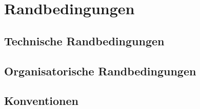 \chapter{Randbedingungen}

\section{Technische Randbedingungen}

\section{Organisatorische Randbedingungen}

\section{Konventionen}